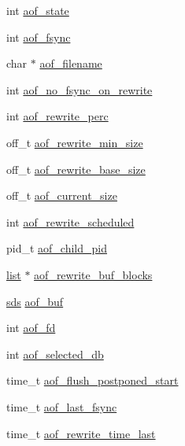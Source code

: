 \begin{DoxyCompactItemize}
\item 
int \hyperlink{structredis_server_a9142dcad31984d994f392be24e91daff}{aof\+\_\+state}
\item 
int \hyperlink{structredis_server_a051898042b62130483a09369ab92e5b0}{aof\+\_\+fsync}
\item 
char $\ast$ \hyperlink{structredis_server_a9bdcedcc3282626ac99ee15091d20586}{aof\+\_\+filename}
\item 
int \hyperlink{structredis_server_a3cdc960c3fc022e4c1d7a92aafc7ae2f}{aof\+\_\+no\+\_\+fsync\+\_\+on\+\_\+rewrite}
\item 
int \hyperlink{structredis_server_ac106a3df3840507040d96398c5872311}{aof\+\_\+rewrite\+\_\+perc}
\item 
off\+\_\+t \hyperlink{structredis_server_a1fc70c8161cd5f19a076dc119c7cf0af}{aof\+\_\+rewrite\+\_\+min\+\_\+size}
\item 
off\+\_\+t \hyperlink{structredis_server_a44b41e9adbd5c3f5d46df203b79d987a}{aof\+\_\+rewrite\+\_\+base\+\_\+size}
\item 
off\+\_\+t \hyperlink{structredis_server_a144bfd85a66513e2cba147e3329c6e0d}{aof\+\_\+current\+\_\+size}
\item 
int \hyperlink{structredis_server_aab840164dbc88da9dd9f21004b92e3ea}{aof\+\_\+rewrite\+\_\+scheduled}
\item 
pid\+\_\+t \hyperlink{structredis_server_af73bffcc3e30fc85b9d48a90ac28adb1}{aof\+\_\+child\+\_\+pid}
\item 
\hyperlink{structlist}{list} $\ast$ \hyperlink{structredis_server_aa6e66223da4f3db4ea910d642783d1bb}{aof\+\_\+rewrite\+\_\+buf\+\_\+blocks}
\item 
\hyperlink{sds_8h_ad69abac3df4532879db9642c95f5ef6f}{sds} \hyperlink{structredis_server_a4546e03b0256d4d50b71681b6cd45f52}{aof\+\_\+buf}
\item 
int \hyperlink{structredis_server_a1499cec4d5dc7a8bda9c061289c7a500}{aof\+\_\+fd}
\item 
int \hyperlink{structredis_server_a6e58fa4905fbaedc73bcc1c128f34f68}{aof\+\_\+selected\+\_\+db}
\item 
time\+\_\+t \hyperlink{structredis_server_addf6373063f352c2ede7d06f1260b820}{aof\+\_\+flush\+\_\+postponed\+\_\+start}
\item 
time\+\_\+t \hyperlink{structredis_server_acbcfbae88969a2dd7d176d58ae6110d7}{aof\+\_\+last\+\_\+fsync}
\item 
time\+\_\+t \hyperlink{structredis_server_ace9d6cef9af1e3feb31816a30a017a7c}{aof\+\_\+rewrite\+\_\+time\+\_\+last}

\end{DoxyCompactItemize}
